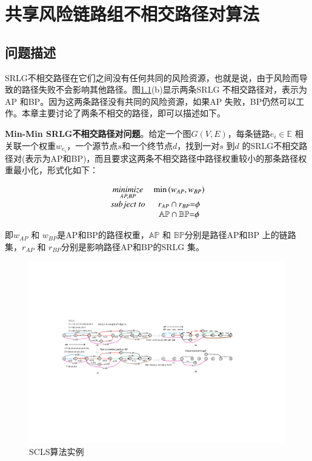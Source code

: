 \chapter{共享风险链路组不相交路径对算法}

\section{问题描述}
SRLG不相交路径在它们之间没有任何共同的风险资源，也就是说，由于风险而导致的路径失败不会影响其他路径。图\ref{fig:CompositeGraph}(b)显示两条SRLG 不相交路径对，表示为AP 和BP。因为这两条路径没有共同的风险资源，如果AP 失败，BP仍然可以工作。本章主要讨论了两条不相交的路径，即可以描述如下。

\textbf{Min-Min SRLG不相交路径对问题}。给定一个图$G(V,E)$，每条链路$e_i\in \mathbb{E}$ 相关联一个权重$w_{e_i}$，一个源节点$s$和一个终节点$d$，找到一对$s$ 到$d$ 的SRLG不相交路径对(表示为AP和BP)，而且要求这两条不相交路径中路径权重较小的那条路径权重最小化，形式化如下：

\begin{equation}
\begin{array}{*{20}{c}}
   {\mathop {minimize}\limits_{AP,BP} } & {\min \left( {{w_{AP}},{w_{BP}}} \right)}  \\
   {subject\ to} & {{r_{AP}} \cap {r_{BP}}{\rm{ = }}\phi }  \\
   {} & {\mathbb{AP} \cap \mathbb{BP}{\rm{ = }}\phi }  \\
\end{array}
\label{eq:problem definition}
\end{equation}

即${w_{AP}}$ 和 ${w_{BP}}$是AP和BP的路径权重，$\mathbb{AP}$ 和 $\mathbb{BP}$分别是路径AP和BP 上的链路集，${r_{AP}}$ 和 ${r_{BP}}$分别是影响路径AP和BP的SRLG 集。


\begin{figure}[tp]
  \centering
  \includegraphics[width=7.2in]{figures/CompositeGraph}
  \caption{SCLS算法实例}
  \label{fig:CompositeGraph}
\end{figure}

